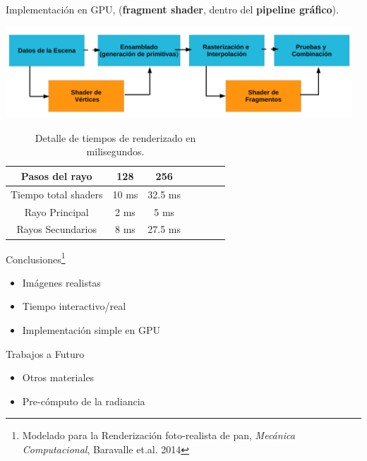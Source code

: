 \documentclass[spanish,unknownkeysallowed,10pt]{beamer}
\begin{document}
\begin{frame}
Implementación en GPU, (\textbf{fragment shader}, dentro del \textbf{pipeline gráfico}).

\centerline{\includegraphics[width=13cm]{../figures/pipelinegrafico}}

\begin{table}[htb]
\centering

\begin{tabular}{|c|c|c|c|c|c|c|}
\hline
 Pasos del rayo         & 128 &  256 \\
\hline
\hline
 Tiempo total shaders   & 10 ms &  32.5 ms \\
\hline
 Rayo Principal         & 2 ms  & 5 ms  \\
\hline
 Rayos Secundarios      &  8 ms & 27.5 ms  \\
\hline
\end{tabular}
\caption{Detalle de tiempos de renderizado en milisegundos.}
\label{tab:n2}
\end{table}


\end{frame}


\begin{frame}{Conclusiones\footnote{Modelado para la Renderización foto-realista de pan, {\it Mecánica Computacional}, Baravalle et.al. 2014}}
\begin{itemize}
\item Imágenes realistas
\item Tiempo interactivo/real
\item Implementación simple en GPU
\end{itemize}

\begin{block}{Trabajos a Futuro}
\begin{itemize}
\item Otros materiales
\item Pre-cómputo de la radiancia
\end{itemize}
\end{block}
\end{frame}

\end{document}
